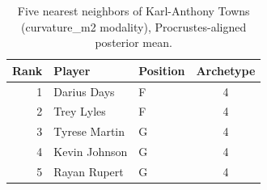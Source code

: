 \begin{table}[htbp]
  \centering\small
  \begin{tabular}{rllc}
    \toprule
    Rank & Player & Position & Archetype \\
    \midrule
    1 & Darius Days & F & 4 \\
    2 & Trey Lyles & F & 4 \\
    3 & Tyrese Martin & G & 4 \\
    4 & Kevin Johnson & G & 4 \\
    5 & Rayan Rupert & G & 4 \\
    \bottomrule
  \end{tabular}
  \caption{Five nearest neighbors of Karl-Anthony Towns (curvature_m2 modality), Procrustes-aligned posterior mean.}
  \label{tab:Karl_Anthony_Towns_neighbors_curvature_m2}
\end{table}

